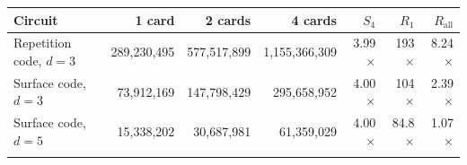 \begin{tabular}{@{}lrrrrrr@{}}
\toprule
Circuit & 1 card & 2 cards & 4 cards & $S_4$ & $R_1$ & $R_{\mathrm{all}}$ \\
\midrule
Repetition code, $d=3$ & 289{,}230{,}495 & 577{,}517{,}899 & 1{,}155{,}366{,}309 & 3.99$\times$ & 193$\times$ & 8.24$\times$ \\
Surface code, $d=3$ & 73{,}912{,}169 & 147{,}798{,}429 & 295{,}658{,}952 & 4.00$\times$ & 104$\times$ & 2.39$\times$ \\
Surface code, $d=5$ & 15{,}338{,}202 & 30{,}687{,}981 & 61{,}359{,}029 & 4.00$\times$ & 84.8$\times$ & 1.07$\times$ \\
\botrule
\end{tabular}
